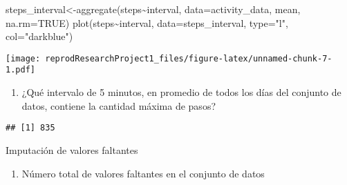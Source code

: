 \documentclass[
]{article}
\newenvironment{Shaded}{\begin{snugshade}}{\end{snugshade}}
\newcommand{\AttributeTok}[1]{\textcolor[rgb]{0.77,0.63,0.00}{#1}}
\newcommand{\ConstantTok}[1]{\textcolor[rgb]{0.00,0.00,0.00}{#1}}
\newcommand{\FunctionTok}[1]{\textcolor[rgb]{0.00,0.00,0.00}{#1}}
\newcommand{\NormalTok}[1]{#1}
\newcommand{\OtherTok}[1]{\textcolor[rgb]{0.56,0.35,0.01}{#1}}
\newcommand{\SpecialCharTok}[1]{\textcolor[rgb]{0.00,0.00,0.00}{#1}}
\newcommand{\StringTok}[1]{\textcolor[rgb]{0.31,0.60,0.02}{#1}}
\providecommand{\tightlist}{%
  \setlength{\itemsep}{0pt}\setlength{\parskip}{0pt}}
\begin{document}
\begin{Shaded}
\begin{Highlighting}[]
\NormalTok{steps\_interval}\OtherTok{\textless{}{-}}\FunctionTok{aggregate}\NormalTok{(steps}\SpecialCharTok{\textasciitilde{}}\NormalTok{interval, }\AttributeTok{data=}\NormalTok{activity\_data, mean, }\AttributeTok{na.rm=}\ConstantTok{TRUE}\NormalTok{)}
\FunctionTok{plot}\NormalTok{(steps}\SpecialCharTok{\textasciitilde{}}\NormalTok{interval, }\AttributeTok{data=}\NormalTok{steps\_interval, }\AttributeTok{type=}\StringTok{"l"}\NormalTok{, }\AttributeTok{col=}\StringTok{"darkblue"}\NormalTok{)}
\end{Highlighting}
\end{Shaded}

\texttt{[image: reprodResearchProject1\_files/figure-latex/unnamed-chunk-7-1.pdf]}

\begin{enumerate}
\def\labelenumi{\arabic{enumi}.}
\setcounter{enumi}{1}
\tightlist
\item
  ¿Qué intervalo de 5 minutos, en promedio de todos los días del
  conjunto de datos, contiene la cantidad máxima de pasos?
\end{enumerate}

\begin{Shaded}
\end{Shaded}

\begin{verbatim}
## [1] 835
\end{verbatim}

Imputación de valores faltantes

\begin{enumerate}
\def\labelenumi{\arabic{enumi}.}
\tightlist
\item
  Número total de valores faltantes en el conjunto de datos
\end{enumerate}

\begin{Shaded}
\end{Shaded}
\end{document}
